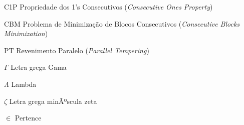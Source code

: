 \documentclass[
	12pt,				%
	openright,			%
	twoside,			%
	a4paper,			%
	english,			%
	french,				%
	spanish,			%
	brazil				%
	]{abntex2}
\begin{document}
\listoffigures*
\cleardoublepage

\listoftables*
\cleardoublepage

\begin{siglas}
	\item[C1P]  Propriedade dos 1's Consecutivos (\textit{Consecutive Ones Property})
	\item[CBM]  Problema de Minimização de Blocos Consecutivos (\textit{Consecutive Blocks Minimization})
	\item[PT]   Revenimento Paralelo (\textit{Parallel Tempering})
\end{siglas}

\begin{simbolos}
	\item[$ \Gamma $] Letra grega Gama
	\item[$ \Lambda $] Lambda
	\item[$ \zeta $] Letra grega minÃºscula zeta
	\item[$ \in $] Pertence
\end{simbolos}

\tableofcontents*
\cleardoublepage





\printindex
\end{document}
